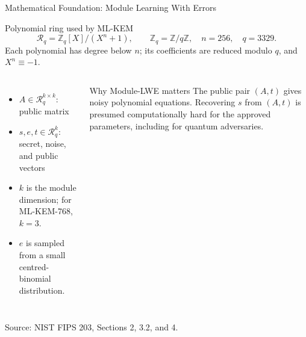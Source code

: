 \documentclass[aspectratio=169,11pt]{beamer}
\newcommand{\source}[1]{\par\vspace{-0.15cm}\hfill{\fontsize{4.5}{5.2}\selectfont\color{Slate!65}Source: NIST FIPS 203, #1.}}
\begin{document}
\begin{frame}{Mathematical Foundation: Module Learning With Errors}
  \small
  \begin{block}{Polynomial ring used by ML-KEM}
    \[
      \mathcal{R}_q=\mathbb{Z}_q[X]/(X^n+1),\qquad
      \mathbb{Z}_q=\mathbb{Z}/q\mathbb{Z},\quad n=256,\quad q=3329.
    \]
    Each polynomial has degree below $n$; its coefficients are reduced modulo $q$, and $X^n\equiv-1$.
  \end{block}
  \vspace{0.03cm}
  \begin{center}
  \end{center}
  \vspace{0.02cm}
  \begin{columns}[T,onlytextwidth]
      \begin{itemize}
        \setlength{\itemsep}{0.17em}
        \item $A\in\mathcal{R}_q^{k\times k}$: public matrix
        \item $s,e,t\in\mathcal{R}_q^k$: secret, noise, and public vectors
        \item $k$ is the module dimension; for ML-KEM-768, $k=3$.
        \item $e$ is sampled from a small centred-binomial distribution.
      \end{itemize}
      \begin{alertblock}{Why Module-LWE matters}
        The public pair $(A,t)$ gives noisy polynomial equations. Recovering $s$ from $(A,t)$ is presumed computationally hard for the approved parameters, including for quantum adversaries.
      \end{alertblock}
  \end{columns}
  \source{Sections 2, 3.2, and 4}
\end{frame}
\end{document}
